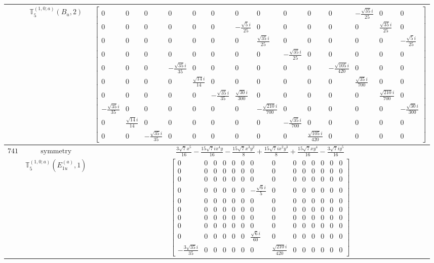 \documentclass[fleqn,8pt,landscape]{jsarticle}
\begin{document}
\begin{longtable}{ccc}
$  $ & $ \mathbb{T}_{5}^{(1,0;a)}(B_{u},2) $ & $ \begin{bmatrix} 0 & 0 & 0 & 0 & 0 & 0 & 0 & 0 & 0 & 0 & 0 & - \frac{\sqrt{35} i}{25} & 0 & 0 \\ 0 & 0 & 0 & 0 & 0 & 0 & - \frac{\sqrt{5} i}{25} & 0 & 0 & 0 & 0 & 0 & \frac{\sqrt{35} i}{25} & 0 \\ 0 & 0 & 0 & 0 & 0 & 0 & 0 & \frac{\sqrt{35} i}{25} & 0 & 0 & 0 & 0 & 0 & - \frac{\sqrt{5} i}{25} \\ 0 & 0 & 0 & 0 & 0 & 0 & 0 & 0 & - \frac{\sqrt{35} i}{25} & 0 & 0 & 0 & 0 & 0 \\ 0 & 0 & 0 & - \frac{\sqrt{35} i}{35} & 0 & 0 & 0 & 0 & 0 & 0 & - \frac{\sqrt{105} i}{420} & 0 & 0 & 0 \\ 0 & 0 & 0 & 0 & \frac{\sqrt{14} i}{14} & 0 & 0 & 0 & 0 & 0 & 0 & \frac{\sqrt{35} i}{700} & 0 & 0 \\ 0 & 0 & 0 & 0 & 0 & - \frac{\sqrt{35} i}{35} & \frac{\sqrt{30} i}{300} & 0 & 0 & 0 & 0 & 0 & \frac{\sqrt{210} i}{700} & 0 \\ - \frac{\sqrt{35} i}{35} & 0 & 0 & 0 & 0 & 0 & 0 & - \frac{\sqrt{210} i}{700} & 0 & 0 & 0 & 0 & 0 & - \frac{\sqrt{30} i}{300} \\ 0 & \frac{\sqrt{14} i}{14} & 0 & 0 & 0 & 0 & 0 & 0 & - \frac{\sqrt{35} i}{700} & 0 & 0 & 0 & 0 & 0 \\ 0 & 0 & - \frac{\sqrt{35} i}{35} & 0 & 0 & 0 & 0 & 0 & 0 & \frac{\sqrt{105} i}{420} & 0 & 0 & 0 & 0 \end{bmatrix} $ \\ \hline
$ 741 $ & $ \text{symmetry} $ & $ \frac{3 \sqrt{7} x^{5}}{16} - \frac{15 \sqrt{7} i x^{4} y}{16} - \frac{15 \sqrt{7} x^{3} y^{2}}{8} + \frac{15 \sqrt{7} i x^{2} y^{3}}{8} + \frac{15 \sqrt{7} x y^{4}}{16} - \frac{3 \sqrt{7} i y^{5}}{16} $ \\
$  $ & $ \mathbb{T}_{5}^{(1,0;a)}(E_{1u}^{(a)},1) $ & $ \begin{bmatrix} 0 & 0 & 0 & 0 & 0 & 0 & 0 & 0 & 0 & 0 & 0 & 0 & 0 & 0 \\ 0 & 0 & 0 & 0 & 0 & 0 & 0 & 0 & 0 & 0 & 0 & 0 & 0 & 0 \\ 0 & 0 & 0 & 0 & 0 & 0 & 0 & 0 & 0 & 0 & 0 & 0 & 0 & 0 \\ 0 & 0 & 0 & 0 & 0 & 0 & - \frac{\sqrt{6} i}{5} & 0 & 0 & 0 & 0 & 0 & 0 & 0 \\ 0 & 0 & 0 & 0 & 0 & 0 & 0 & 0 & 0 & 0 & 0 & 0 & 0 & 0 \\ 0 & 0 & 0 & 0 & 0 & 0 & 0 & 0 & 0 & 0 & 0 & 0 & 0 & 0 \\ 0 & 0 & 0 & 0 & 0 & 0 & 0 & 0 & 0 & 0 & 0 & 0 & 0 & 0 \\ 0 & 0 & 0 & 0 & 0 & 0 & 0 & 0 & 0 & 0 & 0 & 0 & 0 & 0 \\ 0 & 0 & 0 & 0 & 0 & 0 & \frac{\sqrt{6} i}{60} & 0 & 0 & 0 & 0 & 0 & 0 & 0 \\ - \frac{3 \sqrt{35} i}{35} & 0 & 0 & 0 & 0 & 0 & 0 & \frac{\sqrt{210} i}{420} & 0 & 0 & 0 & 0 & 0 & 0 \end{bmatrix} $ \\ \hline

\end{longtable}
\end{document}
